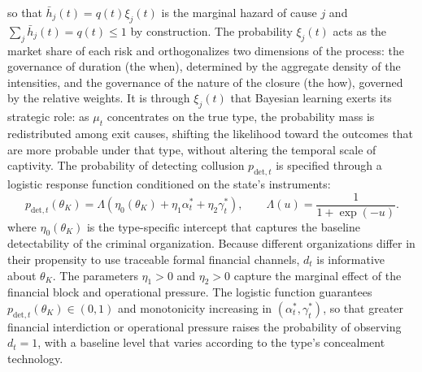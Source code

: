 \documentclass[pdflatex,sn-mathphys-ay]{sn-jnl}
\theoremstyle{plain}
\theoremstyle{definition}
\newcommand{\1}{\mathbf{1}}
\begin{document}
so that $\bar h_j(t)=q(t)\xi_j(t)$ is the marginal hazard of cause $j$ and $\sum_j \bar h_j(t)=q(t)\leq 1$ by construction. The probability $\xi_j(t)$ acts as the market share of each risk and orthogonalizes two dimensions of the process: the governance of duration (the when), determined by the aggregate density of the intensities, and the governance of the nature of the closure (the how), governed by the relative weights. It is through $\xi_j(t)$ that Bayesian learning exerts its strategic role: as $\mu_t$ concentrates on the true type, the probability mass is redistributed among exit causes, shifting the likelihood toward the outcomes that are more probable under that type, without altering the temporal scale of captivity. The probability of detecting collusion $p_{\mathrm{det},t}$ is specified through a logistic response function conditioned on the state's instruments:
\begin{equation}
p_{\mathrm{det},t}(\theta_K)=\Lambda(\eta_0(\theta_K)+\eta_1\alpha_t^\ast+\eta_2\gamma_t^\ast),\qquad\Lambda(u)=\frac{1}{1+\exp(-u)}.
\label{eq:detection}
\end{equation}
where $\eta_0(\theta_K)$ is the type-specific intercept that captures the baseline detectability of the criminal organization. Because different organizations differ in their propensity to use traceable formal financial channels, $d_t$ is informative about $\theta_K$. The parameters $\eta_1>0$ and $\eta_2>0$ capture the marginal effect of the financial block and operational pressure. The logistic function guarantees $p_{\mathrm{det},t}(\theta_K)\in(0,1)$ and monotonicity increasing in $(\alpha_t^\ast,\gamma_t^\ast)$, so that greater financial interdiction or operational pressure raises the probability of observing $d_t=1$, with a baseline level that varies according to the type's concealment technology.
\end{document}
